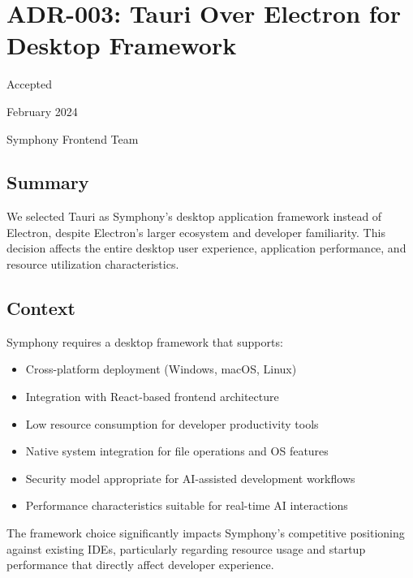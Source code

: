 \section*{ADR-003: Tauri Over Electron for Desktop Framework}

\begin{description}[leftmargin=3cm,labelwidth=2.5cm]
\item[\textbf{Status}] Accepted
\item[\textbf{Date}] February 2024
\item[\textbf{Authors}] Symphony Frontend Team
\end{description}

\subsection*{Summary}

We selected Tauri as Symphony's desktop application framework instead of Electron, despite Electron's larger ecosystem and developer familiarity. This decision affects the entire desktop user experience, application performance, and resource utilization characteristics.

\subsection*{Context}

Symphony requires a desktop framework that supports:

\begin{itemize}
\item Cross-platform deployment (Windows, macOS, Linux)
\item Integration with React-based frontend architecture
\item Low resource consumption for developer productivity tools
\item Native system integration for file operations and OS features
\item Security model appropriate for AI-assisted development workflows
\item Performance characteristics suitable for real-time AI interactions
\end{itemize}

The framework choice significantly impacts Symphony's competitive positioning against existing IDEs, particularly regarding resource usage and startup performance that directly affect developer experience.

